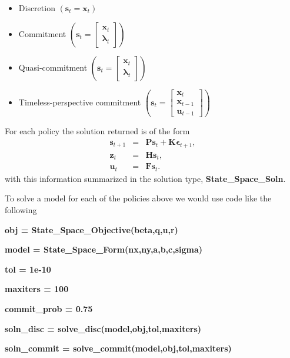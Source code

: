 \documentclass[thmsa,notitlepage,11pt]{article}
\begin{document}
\begin{itemize}
\item Discretion $\left( \mathbf{s}_{t}=\mathbf{x}_{t}\right) $

\item Commitment $\left( \mathbf{s}_{t}=\left[ 
\begin{array}{c}
\mathbf{x}_{t} \\ 
\mathbf{\lambda }_{t}%
\end{array}%
\right] \right) $

\item Quasi-commitment $\left( \mathbf{s}_{t}=\left[ 
\begin{array}{c}
\mathbf{x}_{t} \\ 
\mathbf{\lambda }_{t}%
\end{array}%
\right] \right) $

\item Timeless-perspective commitment $\left( \mathbf{s}_{t}=\left[ 
\begin{array}{c}
\mathbf{x}_{t} \\ 
\mathbf{x}_{t-1} \\ 
\mathbf{u}_{t-1}%
\end{array}%
\right] \right) $
\end{itemize}

For each policy the solution returned is of the form%
\begin{eqnarray*}
\mathbf{s}_{t+1} &=&\mathbf{Ps}_{t}+\mathbf{K\epsilon }_{t+1}, \\
\mathbf{z}_{t} &=&\mathbf{Hs}_{t}, \\
\mathbf{u}_{t} &=&\mathbf{Fs}_{t}.
\end{eqnarray*}%
with this information summarized in the solution type, \textbf{%
State\_Space\_Soln}.

To solve a model for each of the policies above we would use code like the
following

\bigskip

\textbf{obj = State\_Space\_Objective(beta,q,u,r)}

\textbf{model = State\_Space\_Form(nx,ny,a,b,c,sigma)}

\textbf{tol = 1e-10}

\textbf{maxiters = 100}

\textbf{commit\_prob = 0.75}

\textbf{soln\_disc = solve\_disc(model,obj,tol,maxiters)}

\textbf{soln\_commit = solve\_commit(model,obj,tol,maxiters)}
\end{document}

